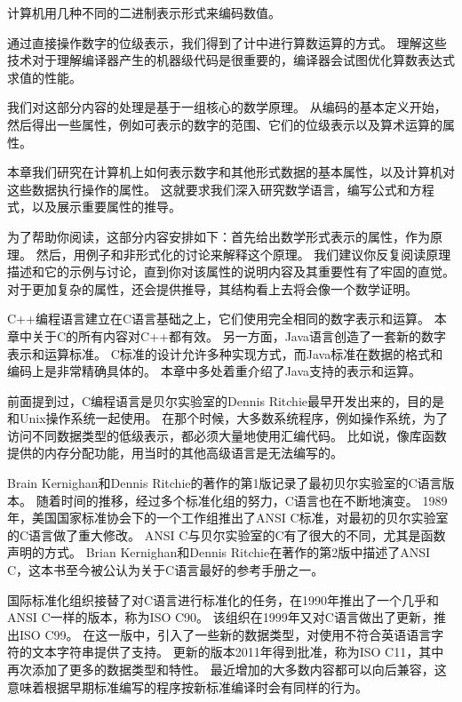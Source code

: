 {    计算机用几种不同的二进制表示形式来编码数值。

    通过直接操作数字的位级表示，我们得到了计中进行算数运算的方式。
    理解这些技术对于理解编译器产生的机器级代码是很重要的，编译器会试图优化算数表达式求值的性能。

    我们对这部分内容的处理是基于一组核心的数学原理。
    从编码的基本定义开始，然后得出一些属性，例如可表示的数字的范围、它们的位级表示以及算术运算的属性。

    \begin{sidenote}[怎样阅读本章]
        本章我们研究在计算机上如何表示数字和其他形式数据的基本属性，以及计算机对这些数据执行操作的属性。
        这就要求我们深入研究数学语言，编写公式和方程式，以及展示重要属性的推导。

        为了帮助你阅读，这部分内容安排如下：首先给出数学形式表示的属性，作为原理。
        然后，用例子和非形式化的讨论来解释这个原理。
        我们建议你反复阅读原理描述和它的示例与讨论，直到你对该属性的说明内容及其重要性有了牢固的直觉。
        对于更加复杂的属性，还会提供推导，其结构看上去将会像一个数学证明。
    \end{sidenote}

    C++编程语言建立在C语言基础之上，它们使用完全相同的数字表示和运算。
    本章中关于C的所有内容对C++都有效。
    另一方面，Java语言创造了一套新的数字表示和运算标准。
    C标准的设计允许多种实现方式，而Java标准在数据的格式和编码上是非常精确具体的。
    本章中多处着重介绍了Java支持的表示和运算。

    \begin{sidenote}[C编程语言的演变]
        前面提到过，C编程语言是贝尔实验室的Dennis Ritchie最早开发出来的，目的是和Unix操作系统一起使用。
        在那个时候，大多数系统程序，例如操作系统，为了访问不同数据类型的低级表示，都必须大量地使用汇编代码。
        比如说，像库函数提供的内存分配功能，用当时的其他高级语言是无法编写的。

        Brain Kernighan和Dennis Ritchie的著作的第1版记录了最初贝尔实验室的C语言版本。
        随着时间的推移，经过多个标准化组的努力，C语言也在不断地演变。
        1989年，美国国家标准协会下的一个工作组推出了ANSI C标准，对最初的贝尔实验室的C语言做了重大修改。
        ANSI C与贝尔实验室的C有了很大的不同，尤其是函数声明的方式。
        Brian Kernighan和Dennis Ritchie在著作的第2版中描述了ANSI C，这本书至今被公认为关于C语言最好的参考手册之一。

        国际标准化组织接替了对C语言进行标准化的任务，在1990年推出了一个几乎和ANSI C一样的版本，称为ISO C90。
        该组织在1999年又对C语言做出了更新，推出ISO C99。
        在这一版中，引入了一些新的数据类型，对使用不符合英语语言字符的文本字符串提供了支持。
        更新的版本2011年得到批准，称为ISO C11，其中再次添加了更多的数据类型和特性。
        最近增加的大多数内容都可以向后兼容，这意味着根据早期标准编写的程序按新标准编译时会有同样的行为。
    \end{sidenote}

    
    
    
    
    
    
}
\cleardoublepage

\endinput
